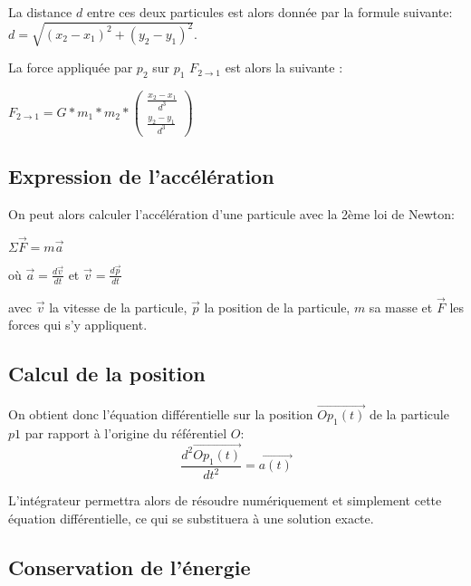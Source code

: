 La distance $d$ entre ces deux particules est alors donnée par la
formule suivante:
$d= \sqrt{(x_2-x_1)^2 + (y_2 - y_1)^2}$.

La force appliquée par $p_2$ sur $p_1$ $F_{2 \rightarrow 1}$ est alors la suivante :

\begin{center}
$F_{2 \rightarrow 1}=G*m_1*m_2*\begin{pmatrix}
\frac{x_2 -x_1}{d^3}\\
\frac{y_2 -y_1}{d^3}
\end{pmatrix}
$
\end{center}

\vspace{3mm}
\subsection{Expression de l'accélération}
\vspace{2mm}

On peut alors calculer l'accélération d'une particule avec la 2ème loi de Newton:
\begin{center}
    


$\Sigma \vec{F} = m \vec{a}$

\vspace{2mm}
où 
$\vec{a}=\frac{d\vec{v}}{dt}$ et $ \vec{v}= \frac{d\vec{p}}{dt}$


\end{center}

avec $\vec{v}$ la vitesse de la particule, $\vec{p}$ la position de la particule, $m$ sa masse et $\vec{F}$ les forces qui s'y appliquent.

\subsection{Calcul de la position}

On obtient donc l'équation différentielle sur la position $\vec{Op_1(t)}$ de la particule $p1$ par rapport à l'origine du référentiel $O$:
\begin{equation}
\frac{d^2 \vec{Op_1(t)}}{dt^2} = \vec{a(t)}
\end{equation}

L'intégrateur permettra alors de résoudre numériquement et simplement cette équation différentielle, ce qui se substituera à une solution exacte.

\subsection{Conservation de l'énergie}

